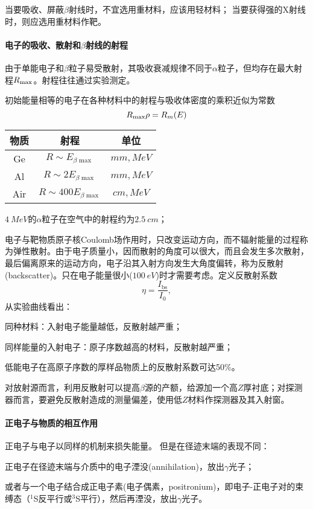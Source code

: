 当要吸收、屏蔽$\beta$射线时，不宜选用重材料，应该用轻材料；
当要获得强的X射线时，则应选用重材料作靶。

\paragraph{电子的吸收、散射和$\beta$射线的射程}
由于单能电子和$\beta$粒子易受散射，其吸收衰减规律不同于$\alpha$粒子，但均存在最大射程$R_\mathrm{max}$。射程往往通过实验测定。

初始能量相等的电子在各种材料中的射程与吸收体密度的乘积近似为常数
\[
	R_\mathrm{max} \rho=R_m(E)
\]
\begin{center}
	\begin{tabular}{ccc}
		\toprule
		物质&射程&单位\\
		\midrule
		Ge&$R\sim E_{\beta\max{}}$&$\si{mm},\si{MeV}$\\
		Al&$R\sim 2E_{\beta\max{}}$&$\si{mm},\si{MeV}$\\
		Air&$R\sim 400E_{\beta\max{}}$&$\si{cm},\si{MeV}$\\
		\bottomrule
	\end{tabular}
\end{center}
$\SI{4}{MeV}$的$\alpha$粒子在空气中的射程约为$\SI{2.5}{cm}$；

电子与靶物质原子核Coulomb场作用时，只改变运动方向，而不辐射能量的过程称为弹性散射。由于电子质量小，因而散射的角度可以很大，而且会发生多次散射，最后偏离原来的运动方向，电子沿其入射方向发生大角度偏转，称为反散射(backscatter)。只在电子能量很小($\SI{100}{eV}$)时才需要考虑。定义反散射系数
\[
	\eta=\frac{I_{\mathrm{bs}}}{I_0},
\]
从实验曲线看出：
\begin{compactenum}
	\item 同种材料：入射电子能量越低，反散射越严重；
	\item 同样能量的入射电子：原子序数越高的材料，反散射越严重；
	\item 低能电子在高原子序数的厚样品物质上的反散射系数可达50\%。
\end{compactenum}
对放射源而言，利用反散射可以提高$\beta$源的产额，给源加一个高$Z$厚衬底；对探测器而言，要避免反散射造成的测量偏差，使用低$Z$材料作探测器及其入射窗。
\paragraph{正电子与物质的相互作用}
正电子与电子以同样的机制来损失能量。
但是在径迹末端的表现不同：
\begin{compactitem}
	\item 正电子在径迹末端与介质中的电子湮没(annihilation)，放出$\gamma$光子；
	\item 或者与一个电子结合成正电子素(电子偶素，positronium)，即电子-正电子对的束缚态（$^1$S反平行或$^3$S平行），然后再湮没，放出$\gamma$光子。
\end{compactitem}

